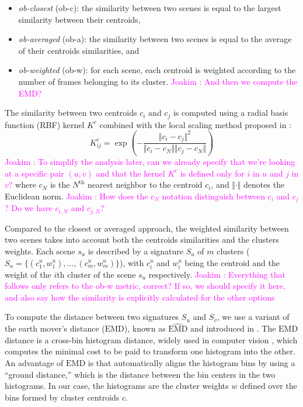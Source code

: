 \documentclass[journal]{IEEEtran}
\newcommand*{\EMD}{\mathrm{EMD}}
\newcommand{\ja}[1]{\textcolor{magenta}{Joakim : #1}}
\begin{document}
\begin{itemize}
\item \emph{ob-closest} (ob-c): the similarity between two scenes is equal to the largest similarity between their centroids,
\item \emph{ob-averaged} (ob-a): the similarity between two scenes is equal to the average of their centroids similarities, and
\item \emph{ob-weighted} (ob-w): for each scene, each centroid is weighted according to the number of frames belonging to its cluster. \ja{And then we compute the EMD?}
\end{itemize}

The similarity between two centroids $c_i$ and $c_j$ is computed using a radial basis function (RBF) kernel $K^c$ combined with the local scaling method proposed in \cite{selfTuneManor2004}:
\begin{equation}
\label{eq:kc}
K^c_{ij} = \exp\left( - \dfrac{\Vert c_i - c_j \Vert^2}{\Vert c_i - c_N \Vert \Vert c_j - c_N \Vert} \right) 
\end{equation} \ja{To simplify the analysis later, can we already specify that we're looking at a specific pair $(u, v)$ and that the kernel $K^c$ is defined only for $i$ in $u$ and $j$ in $v$?}
where $c_N$ is the $N^{\textrm{th}}$ nearest neighbor to the centroid $c_i$, and $\Vert \cdot \Vert$ denotes the Euclidean norm. \ja{How does the $c_N$ notation distinguish between $c_i$ and $c_j$? Do we have $c_{i,N}$ and $c_{j,N}$?}

Compared to the closest or averaged approach, the weighted similarity between two scenes takes into account both the centroids similarities and the clusters weights. Each scene $s_u$ is described by a signature $S_u$ of $m$ clusters ($S_u=\lbrace(c_1^u,w_1^u),\ldots,(c_m^u,w_m^u)\rbrace$), with $c_i^u$ and $w_i^u$ being the centroid and the weight of the $i$th cluster of the scene $s_u$ respectively. \ja{Everything that follows only refers to the ob-w metric, correct? If so, we should specify it here, and also say how the similarity is explicitly calculated for the other options}

To compute the distance between two signatures $S_u$ and $S_v$, we use a variant of the earth mover's distance ($\EMD$), known as $\widehat{\EMD}$ and introduced in \cite{pele2008linear}. The $\EMD$ distance is a cross-bin histogram distance, widely used in computer vision \cite{zhang2007local}, which computes the minimal cost to be paid to transform one histogram into the other. An advantage of $\EMD$ is that automatically aligns the histogram bins by using a ``ground distance,'' which is the distance between the bin centers in the two histograms. In our case, the histograms are the cluster weights $w$ defined over the bins formed by cluster centroids $c$.
\end{document}
